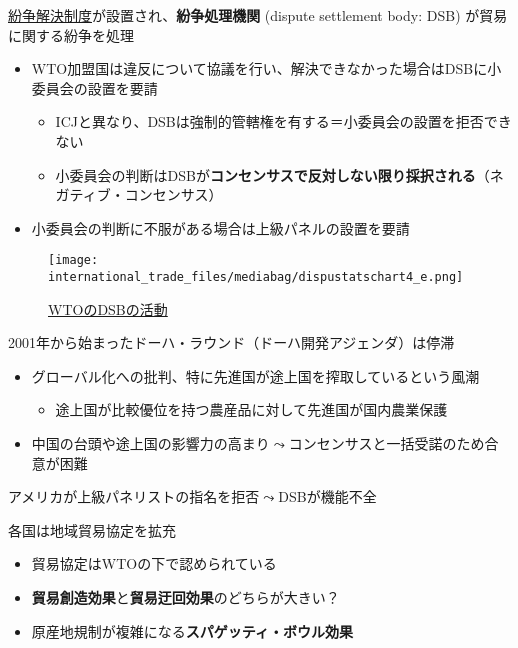\documentclass[
  xelatex,
  ja=standard]{bxjsarticle}
\providecommand{\tightlist}{%
  \setlength{\itemsep}{0pt}\setlength{\parskip}{0pt}}\usepackage{longtable,booktabs,array}
\begin{document}
\href{https://www.mofa.go.jp/mofaj/gaiko/wto/funso/seido.html}{紛争解決制度}が設置され、\textbf{紛争処理機関}
(dispute settlement body: DSB) が貿易に関する紛争を処理

\begin{itemize}
\tightlist
\item
  WTO加盟国は違反について協議を行い、解決できなかった場合はDSBに小委員会の設置を要請

  \begin{itemize}
  \tightlist
  \item
    ICJと異なり、DSBは強制的管轄権を有する＝小委員会の設置を拒否できない
  \item
    小委員会の判断はDSBが\textbf{コンセンサスで反対しない限り採択される}（ネガティブ・コンセンサス）
  \end{itemize}
\item
  小委員会の判断に不服がある場合は上級パネルの設置を要請
\end{itemize}

\begin{figure}[htpb]

{\centering \texttt{[image: international\_trade\_files/mediabag/dispustatschart4\_e.png]}

}

\caption{\href{https://www.wto.org/english/tratop_e/dispu_e/dispustats_e.htm}{WTOのDSBの活動}}

\end{figure}

2001年から始まったドーハ・ラウンド（ドーハ開発アジェンダ）は停滞

\begin{itemize}
\tightlist
\item
  グローバル化への批判、特に先進国が途上国を搾取しているという風潮

  \begin{itemize}
  \tightlist
  \item
    途上国が比較優位を持つ農産品に対して先進国が国内農業保護
  \end{itemize}
\item
  中国の台頭や途上国の影響力の高まり\(\leadsto\)コンセンサスと一括受諾のため合意が困難
\end{itemize}

アメリカが上級パネリストの指名を拒否\(\leadsto\)DSBが機能不全

各国は地域貿易協定を拡充

\begin{itemize}
\tightlist
\item
  貿易協定はWTOの下で認められている
\item
  \textbf{貿易創造効果}と\textbf{貿易迂回効果}のどちらが大きい？
\item
  原産地規制が複雑になる\textbf{スパゲッティ・ボウル効果}
\end{itemize}
\end{document}
